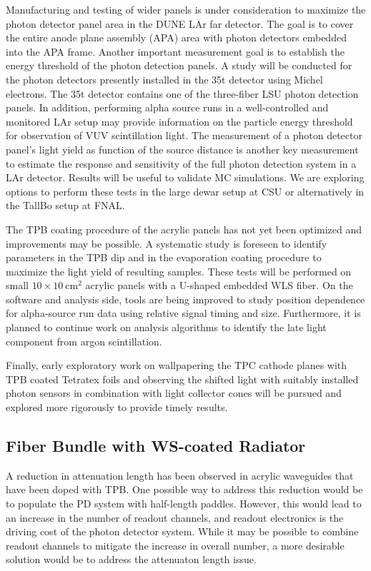 Manufacturing and testing of wider panels is under consideration to
maximize the photon detector panel area in the DUNE LAr far
detector. The goal is to cover the entire anode plane assembly (APA)
area with photon detectors embedded into the APA frame.  Another
important measurement goal is to establish the energy threshold of the
photon detection panels. A study will be conducted for the photon
detectors presently installed in the 35t detector  using Michel
electrons. The 35t detector contains one of the three-fiber LSU photon
detection panels. In addition, performing alpha source runs in a well-controlled
and monitored LAr setup may provide information on the particle energy
threshold for observation of VUV scintillation light.  The measurement
of a photon detector panel's light yield as function of the source
distance is another key measurement to estimate the response and
sensitivity of the full photon detection system in a LAr
detector. Results will be useful to validate MC simulations.  We are
exploring options to perform these tests in the large dewar setup at
CSU or alternatively in the TallBo setup  at FNAL.

The TPB coating procedure of the acrylic panels has not yet been
optimized and improvements may be possible. A systematic
study is foreseen to identify parameters in the TPB dip and %
in the
evaporation coating procedure to maximize the light yield of resulting
samples. These tests will be performed on small
$10\times10~\mathrm{cm}^2$ acrylic panels with a U-shaped embedded WLS
fiber.  On the software and analysis side, %
tools are being improved to study position dependence for alpha-source run
data using relative signal timing and size. Furthermore, it is planned to
continue work on analysis algorithms to identify the late light
component from argon scintillation.

Finally, early exploratory work on wallpapering the TPC cathode planes
with TPB coated Tetratex foils and observing the shifted light with
suitably installed photon sensors in combination with light collector
cones will be pursued and explored more rigorously to provide timely
results.


\subsection{Fiber Bundle with WS-coated Radiator}

A reduction in attenuation length has been observed in
acrylic waveguides that have been doped with TPB. One possible way to
address this reduction would be to populate the PD system with half-length
paddles. However, this would lead to an increase in the number of readout
channels, and readout
electronics is the driving cost of the photon detector system. While it may be possible to combine readout channels to
mitigate the increase in overall number, a more desirable solution
would be to address the attenuaton length issue.  %

